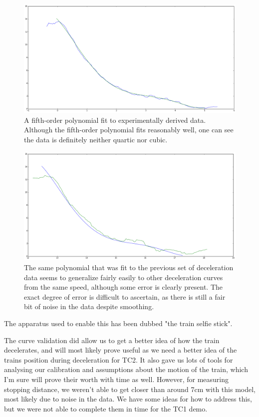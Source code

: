 \documentclass[titlepage]{article}
\begin{document}
\begin{figure}[ht!]
\includegraphics[width=\linewidth]{deaccel.png}
\caption{A fifth-order polynomial fit to experimentally derived data. Although
the fifth-order polynomial fits reasonably well, one can see the data is
definitely neither quartic nor cubic.}
\end{figure}

\begin{figure}[ht!]
\includegraphics[width=\linewidth]{deaccel2.png}
\caption{The same polynomial that was fit to the previous set of deceleration
data seems to generalize fairly easily to other deceleration curves from the
same speed, although some error is clearly present. The exact degree of error
is difficult to ascertain, as there is still a fair bit of noise in the data
despite smoothing.}
\end{figure}

The apparatus used to enable this has been dubbed "the
train selfie stick".

The curve validation did allow us to get a better idea of how the train
decelerates, and will most likely prove useful as we need a better idea
of the trains position during deceleration for TC2. It also gave us lots
of tools for analysing our calibration and assumptions about the motion of
the train, which I'm sure will prove their worth with time as well. However,
for measuring stopping distance, we weren't able to get closer than around 7cm
with this model, most likely due to noise in the data. We have some ideas
for how to address this, but we were not able to complete them in time for
the TC1 demo.
\end{document}

